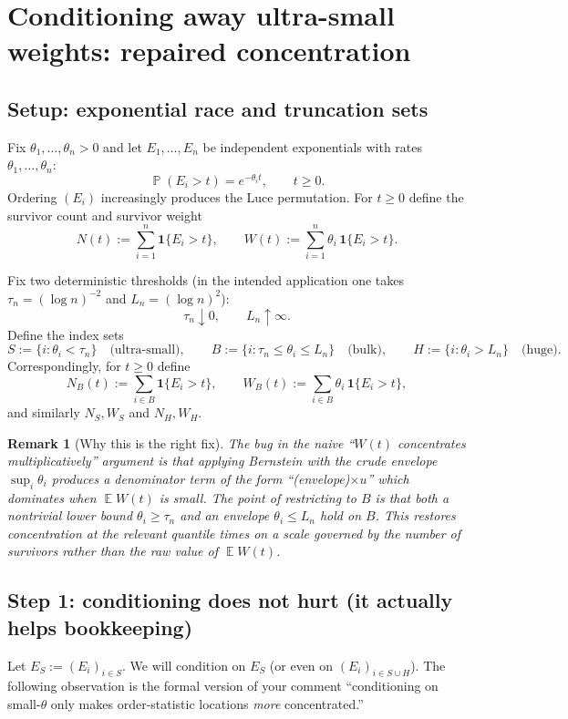 \documentclass[11pt]{article}
\newtheorem{rmk}{Remark}
\DeclareMathOperator{\E}{\mathbb E}
\DeclareMathOperator{\Pp}{\mathbb P}
\begin{document}
\section*{Conditioning away ultra-small weights: repaired concentration}

\subsection*{Setup: exponential race and truncation sets}

Fix $\theta_1,\dots,\theta_n>0$ and let $E_1,\dots,E_n$ be independent exponentials
with rates $\theta_1,\dots,\theta_n$:
\[
\Pp(E_i>t)=e^{-\theta_i t},\qquad t\ge 0.
\]
Ordering $(E_i)$ increasingly produces the Luce permutation.
For $t\ge 0$ define the survivor count and survivor weight
\[
N(t):=\sum_{i=1}^n \mathbf 1\{E_i>t\},
\qquad
W(t):=\sum_{i=1}^n \theta_i\,\mathbf 1\{E_i>t\}.
\]

Fix two deterministic thresholds (in the intended application one takes
$\tau_n=(\log n)^{-2}$ and $L_n=(\log n)^2$):
\[
\tau_n\downarrow 0,\qquad L_n\uparrow\infty.
\]
Define the index sets
\[
S:=\{i:\theta_i<\tau_n\}\quad\text{(ultra-small)},\qquad
B:=\{i:\tau_n\le \theta_i\le L_n\}\quad\text{(bulk)},\qquad
H:=\{i:\theta_i>L_n\}\quad\text{(huge)}.
\]
Correspondingly, for $t\ge 0$ define
\[
N_B(t):=\sum_{i\in B}\mathbf 1\{E_i>t\},\qquad
W_B(t):=\sum_{i\in B}\theta_i\,\mathbf 1\{E_i>t\},
\]
and similarly $N_S,W_S$ and $N_H,W_H$.

\begin{rmk}[Why this is the right fix]
The bug in the naive ``$W(t)$ concentrates multiplicatively'' argument is that applying Bernstein
with the crude envelope $\sup_i \theta_i$ produces a denominator term of the form
``(envelope)$\times u$'' which dominates when $\E W(t)$ is small.
The point of restricting to $B$ is that \emph{both} a nontrivial lower bound
$\theta_i\ge \tau_n$ and an envelope $\theta_i\le L_n$ hold on $B$.
This restores concentration at the relevant quantile times on a scale governed by the
\emph{number of survivors} rather than the raw value of $\E W(t)$.
\end{rmk}

\subsection*{Step 1: conditioning does not hurt (it actually helps bookkeeping)}

Let $E_S:=(E_i)_{i\in S}$.
We will condition on $E_S$ (or even on $(E_i)_{i\in S\cup H}$).
The following observation is the formal version of your comment
``conditioning on small-$\theta$ only makes order-statistic locations \emph{more} concentrated.''
\end{document}
